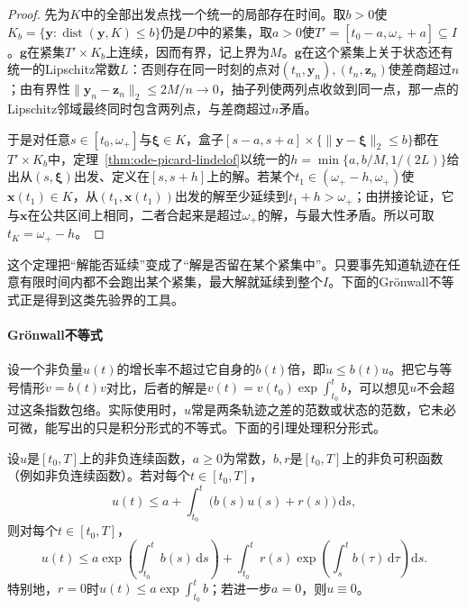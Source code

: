 \begin{proof}
  先为$K$中的全部出发点找一个统一的局部存在时间。取$b>0$使$K_b=\{\bm y:\operatorname{dist}(\bm y,K)\leq b\}$仍是$D$中的紧集，取$a>0$使$T'=[t_0-a,\omega_++a]\subseteq I$。$\bm g$在紧集$T'\times K_b$上连续，因而有界，记上界为$M$。$\bm g$在这个紧集上关于状态还有统一的Lipschitz常数$L$：否则存在同一时刻的点对$(t_n,\bm y_n),(t_n,\bm z_n)$使差商超过$n$；由有界性$\|\bm y_n-\bm z_n\|_2\leq2M/n\to0$，抽子列使两列点收敛到同一点，那一点的Lipschitz邻域最终同时包含两列点，与差商超过$n$矛盾。

  于是对任意$s\in[t_0,\omega_+]$与$\bm\xi\in K$，盒子$[s-a,s+a]\times\{\|\bm y-\bm\xi\|_2\leq b\}$都在$T'\times K_b$中，定理~\ref{thm:ode-picard-lindelof}以统一的$h=\min\{a,b/M,1/(2L)\}$给出从$(s,\bm\xi)$出发、定义在$[s,s+h]$上的解。若某个$t_1\in(\omega_+-h,\omega_+)$使$\bm x(t_1)\in K$，从$(t_1,\bm x(t_1))$出发的解至少延续到$t_1+h>\omega_+$；由拼接论证，它与$\bm x$在公共区间上相同，二者合起来是超过$\omega_+$的解，与最大性矛盾。所以可取$t_K=\omega_+-h$。
\end{proof}

这个定理把“解能否延续”变成了“解是否留在某个紧集中”。只要事先知道轨迹在任意有限时间内都不会跑出某个紧集，最大解就延续到整个$I$。下面的Grönwall不等式正是得到这类先验界的工具。

\paragraph{Grönwall不等式}
设一个非负量$u(t)$的增长率不超过它自身的$b(t)$倍，即$\dot u\leq b(t)u$。把它与等号情形$\dot v=b(t)v$对比，后者的解是$v(t)=v(t_0)\exp\int_{t_0}^tb$，可以想见$u$不会超过这条指数包络。实际使用时，$u$常是两条轨迹之差的范数或状态的范数，它未必可微，能写出的只是积分形式的不等式。下面的引理处理积分形式。

\begin{lemma}[Grönwall积分不等式]
  \label{lem:ode-gronwall}
  \label{lem:action-state-gronwall}
  设$u$是$[t_0,T]$上的非负连续函数，$a\geq0$为常数，$b,r$是$[t_0,T]$上的非负可积函数（例如非负连续函数）。若对每个$t\in[t_0,T]$，
  \begin{equation}
    u(t)\leq a+\int_{t_0}^t\bigl(b(s)u(s)+r(s)\bigr)\,\mathrm ds,
    \label{eq:ode-gronwall-hypothesis}
  \end{equation}
  则对每个$t\in[t_0,T]$，
  \begin{equation}
    u(t)\leq a\exp\left(\int_{t_0}^tb(s)\,\mathrm ds\right)+\int_{t_0}^tr(s)\exp\left(\int_s^tb(\tau)\,\mathrm d\tau\right)\mathrm ds.
    \label{eq:ode-gronwall}
  \end{equation}
  特别地，$r=0$时$u(t)\leq a\exp\int_{t_0}^tb$；若进一步$a=0$，则$u\equiv0$。
\end{lemma}

